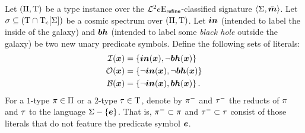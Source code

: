 \begin{definition}
Let $(\Pi,\mathrm{T})$ be a type instance over the
$\mathcal{L}^{2}_{{}}{e}\mathrm{E}_{\mathsf{refine}}$-classified signature $\left\langle \mathrm{\Sigma},\bar{\bm{m}} \right\rangle$.
Let $\sigma \subseteq (\mathrm{T} \cap \mathrm{T}_{\mathrm{c}}[\mathrm{\Sigma}])$ be a cosmic spectrum over
$(\Pi,\mathrm{T})$.
Let $\bm{in}$ (intended to label the inside of the galaxy) and $\bm{bh}$ (intended to
label some \emph{black hole} outside the galaxy) be two new unary predicate
symbols. Define the following sets of literals: 
\begin{align*}
  \mathcal{I}(\bm{x}) &= \left\{\bm{in}(\bm{x}),\lnot\bm{bh}(\bm{x})\right\} \\
  \mathcal{O}(\bm{x}) &= \left\{\lnot\bm{in}(\bm{x}), \lnot\bm{bh}(\bm{x})\right\} \\
  \mathcal{B}(\bm{x}) &= \left\{\lnot\bm{in}(\bm{x}), \bm{bh}(\bm{x})\right\}.
\end{align*}
For a $1$-type $\pi\in\Pi$ or a $2$-type $\tau\in\mathrm{T}$, denote by
$\pi^{-}$ and $\tau^{-}$ the reducts of $\pi$ and $\tau$ to the language $\mathrm{\Sigma} - \left\{\bm{e}\right\}$.
That is, $\pi^{-} \subset \pi$ and $\tau^{-} \subset \tau$ consist of
those literals that do not feature the predicate symbol $\bm{e}$.


\end{definition}
